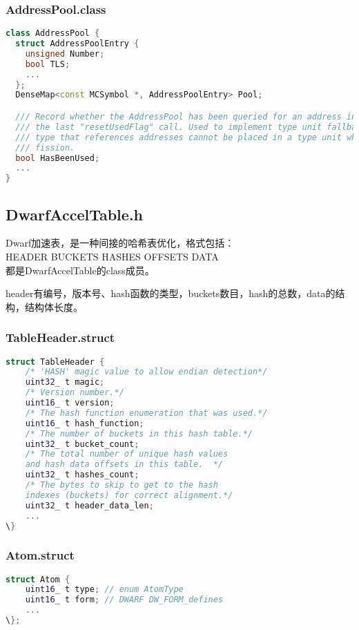 \documentclass{ctexart}
\begin{document}
\subsubsection{AddressPool.class}
\begin{lstlisting}[language=c++]
class AddressPool {
  struct AddressPoolEntry {
    unsigned Number;
    bool TLS;
    ...
  };
  DenseMap<const MCSymbol *, AddressPoolEntry> Pool;

  /// Record whether the AddressPool has been queried for an address index since
  /// the last "resetUsedFlag" call. Used to implement type unit fallback - a
  /// type that references addresses cannot be placed in a type unit when using
  /// fission.
  bool HasBeenUsed;
  ...
}
\end{lstlisting}

\subsection{DwarfAccelTable.h}

Dwarf加速表，是一种间接的哈希表优化，格式包括：
\\
HEADER      BUCKETS   HASHES      OFFSETS     DATA
\\
都是DwarfAccelTable的class成员。


header有编号，版本号、hash函数的类型，buckets数目，hash的总数，data的结构，结构体长度。
\subsubsection{TableHeader.struct}
\begin{lstlisting}[language=c++]
struct TableHeader {
	/* 'HASH' magic value to allow endian detection*/
	uint32_ t magic; 
	/* Version number.*/
	uint16_ t version; 
	/* The hash function enumeration that was used.*/
	uint16_ t hash_function; 
	/* The number of buckets in this hash table.*/
	uint32_ t bucket_count; 
	/* The total number of unique hash values
	and hash data offsets in this table.  */
	uint32_ t hashes_count; 
	/* The bytes to skip to get to the hash
	indexes (buckets) for correct alignment.*/
	uint32_ t header_data_len; 
	...
\}
\end{lstlisting}

\subsubsection{Atom.struct}
\begin{lstlisting}[language=C++]
struct Atom {
	uint16_ t type; // enum AtomType
	uint16_ t form; // DWARF DW_FORM_defines
	...
\};
\end{lstlisting}
\end{document}
